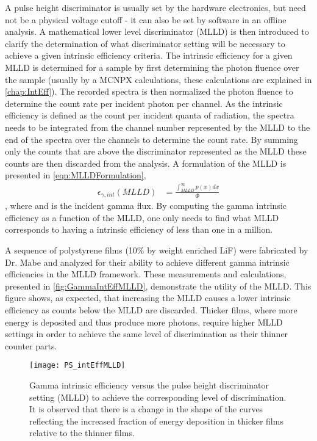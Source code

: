 A pulse height discriminator is usually set by the hardware electronics, but need not be a physical voltage cutoff - it can also be set by software in an offline analysis.
A mathematical lower level discriminator (MLLD) is then introduced to clarify the determination of what discriminator setting will be necessary to achieve a given intrinsic efficiency criteria.
The intrinsic efficiency for a given MLLD is determined for a sample by first determining the photon fluence over the sample (usually by a MCNPX calculations, these calculations are explained in \autoref{chap:IntEff}).
The recorded spectra is then normalized the photon fluence to determine the count rate per incident photon per channel.
As the intrinsic efficiency is defined as the count per incident quanta of radiation, the spectra needs to be integrated from the channel number represented by the MLLD to the end of the spectra over the channels to determine the count rate.
By summing only the counts that are above the discriminator represented as the MLLD these counts are then discarded from the analysis.
A formulation of the MLLD is presented in \eqref{eqn:MLLDFormulation},
\begin{align}
	\epsilon_{\gamma,int}\left(MLLD\right) &= \frac{\int_{MLLD}^{\infty}p(x)dx}{\Phi}
  \label{eqn:MLLDFormulation}
\end{align},
where  and  is the incident gamma flux.
By computing the gamma intrinsic efficiency as a function of the MLLD, one only needs to find what MLLD corresponds to having a intrinsic efficiency of less than one in a million.

A sequence of polystyrene films (10\% by weight enriched LiF) were fabricated by Dr. Mabe and analyzed for their ability to achieve different gamma intrinsic efficiencies in the MLLD framework.
These measurements and calculations, presented in \autoref{fig:GammaIntEffMLLD}, demonstrate the utility of the MLLD.
This figure shows, as expected, that increasing the MLLD causes a lower intrinsic efficiency as counts below the MLLD are discarded.
Thicker films, where more energy is deposited and thus produce more photons, require higher MLLD settings in order to achieve the same level of discrimination as their thinner counter parts.
\begin{figure}
  \centering
    \texttt{[image: PS\_intEffMLLD]}
  \caption[Intrinsic efficiency achieved at various discriminator settings]{Gamma intrinsic efficiency versus the pulse height discriminator setting (MLLD) to achieve the corresponding level of discrimination. It is observed that there is a change in the shape of the curves reflecting the increased fraction of energy deposition in thicker films relative to the thinner films.}
  \label{fig:GammaIntEffMLLD}
\end{figure}

